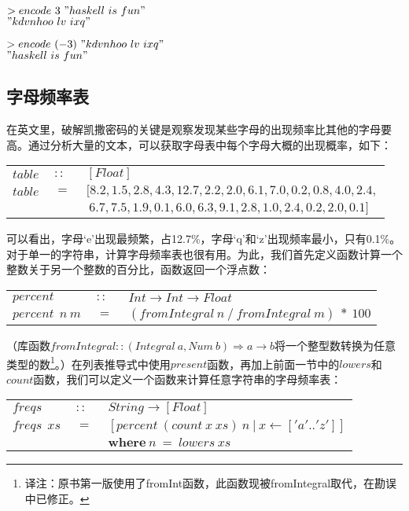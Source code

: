 \noindent\hspace*{1cm}$>encode~3~"haskell~is~fun"$\\
\hspace*{1cm}$"kdvnhoo~lv~ixq"$

\noindent\hspace*{1cm}$>encode~(-3)~"kdvnhoo~lv~ixq"$\\
\hspace*{1cm}$"haskell~is~fun"$

\subsection{字母频率表}
在英文里，破解凯撒密码的关键是观察发现某些字母的出现频率比其他的字母要高。通过分析大量的文本，可以获取字母表中每个字母大概的出现概率，如下：

\begin{tabular}[t]{lll}
  $table$&$~::~$&$[Float]$\\
  $table$&$~=~$&$[8.2, 1.5, 2.8, 4.3, 12.7, 2.2, 2.0, 6.1, 7.0, 0.2, 0.8, 4.0, 2.4,$\\
&&$~6.7, 7.5, 1.9, 0.1, 6.0, 6.3, 9.1, 2.8, 1.0, 2.4, 0.2, 2.0, 0.1]$\\
\end{tabular}

可以看出，字母‘e’出现最频繁，占12.7\%，字母‘q’和‘z’出现频率最小，只有0.1\%。对于单一的字符串，计算字母频率表也很有用。为此，我们首先定义函数计算一个整数关于另一个整数的百分比，函数返回一个浮点数：

\begin{tabular}[t]{lll}
  $percent$&$~::~$&$Int \rightarrow Int \rightarrow Float$\\
  $percent~~n~m$&$~=~$&$(fromIntegral~n~/~fromIntegral~m)~*~100$\\
\end{tabular}

（库函数$fromIntegral::(Integral~a, Num~b) \Rightarrow a \rightarrow b$将一个整型数转换为任意类型的数\footnote{译注：原书第一版使用了fromInt函数，此函数现被fromIntegral取代，在勘误中已修正。}。）在列表推导式中使用$present$函数，再加上前面一节中的$lowers$和$count$函数，我们可以定义一个函数来计算任意字符串的字母频率表：


\begin{tabular}[t]{lll}
  $freqs$&$~::~$&$String \rightarrow [Float]$\\
  $freqs~~xs$&$~=~$&$[percent~(count~x~xs)~n~|~x \leftarrow ['a'..'z']]$\\
  &&$\textbf{where}~n~=~lowers~xs$
\end{tabular}

